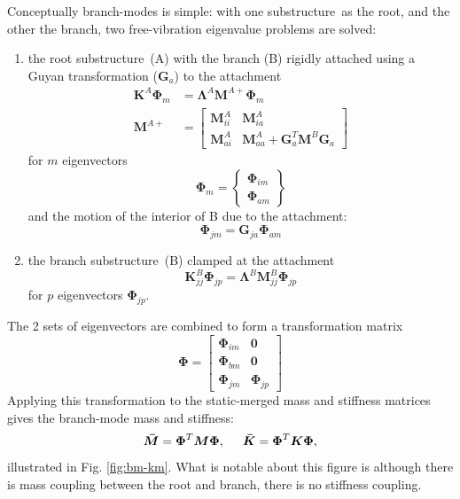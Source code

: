\documentclass[10pt,openany,twoside]{book}
\numberwithin{equation}{section}   %
\newcommand{\Matrix}[1]{\boldsymbol{#1}}
\newcommand{\Figref}[1]{Fig. \ref{#1}}
\newcommand{\Ss}{substructure}
\begin{document}
Conceptually branch-modes is simple: with one \Ss\ as the
root, and the other the branch, two free-vibration eigenvalue problems
are solved:
\begin{enumerate}
	\item the root \Ss\ (A) with the branch (B) rigidly attached using a
		Guyan transformation ($\Matrix{G}_a$) to the attachment
		\begin{align}
			\Matrix{K}^A\Matrix{\Phi}_m & = \Matrix{\Lambda}^A\Matrix{M}^{A+}\Matrix{\Phi}_m \\
			\Matrix{M}^{A+} &= \left[\begin{array}{cc}
				\Matrix{M}^A_{ii}  &  \Matrix{M}^A_{ia} \nonumber \\
				\Matrix{M}^A_{ai}  &  \Matrix{M}^A_{aa} + \Matrix{G}^T_a\Matrix{M}^B\Matrix{G}_a
			\end{array}\right]
		\end{align}
		for $m$ eigenvectors
		\begin{equation}
			\Matrix{\Phi}_m = \left\{\begin{array}{c}
				\Matrix{\Phi}_{im}	\nonumber \\
				\Matrix{\Phi}_{am}	\nonumber
			\end{array}\right\}
		\end{equation}
		and the motion of the interior of B due to the attachment:
		\begin{equation}
			\Matrix{\Phi}_{jm} = \Matrix{G}_{ja}\Matrix{\Phi}_{am}	\nonumber
		\end{equation}
	\item the branch \Ss\ (B) clamped at the attachment
	\begin{equation}
		\Matrix{K}^B_{jj}\Matrix{\Phi}_{jp} = \Matrix{\Lambda}^B\Matrix{M}^B_{jj}\Matrix{\Phi}_{jp}
	\end{equation}
	for $p$ eigenvectors $\Matrix{\Phi}_{jp}$.
\end{enumerate}
The 2 sets of eigenvectors are combined to form a transformation
matrix
\begin{equation*}
\Matrix{\Phi} = \left[
	\begin{array}{cc}
		\Matrix{\Phi}_{im} & \Matrix{0} \\
		\Matrix{\Phi}_{bm} & \Matrix{0} \\
		\Matrix{\Phi}_{jm} & \Matrix{\Phi}_{jp}
	\end{array} \right]
\end{equation*}
\index{=Phi@$\Matrix{\Phi}$!branch modes}
Applying this transformation to the static-merged mass and stiffness
matrices gives the branch-mode mass and stiffness:
\begin{equation}
	\Matrix{\bar{M}} = \Matrix{\Phi}^T \Matrix{M} \Matrix{\Phi},\hspace{0.5cm}
	\Matrix{\bar{K}} = \Matrix{\Phi}^T \Matrix{K} \Matrix{\Phi},
\end{equation}
illustrated in \Figref{fig:bm-km}. What is notable about this figure is
although there is mass coupling between the root and branch, there
is no stiffness coupling.
\end{document}

